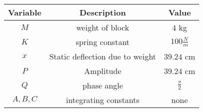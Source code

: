  \begin{tabular}{|c|c|c|} 
      \hline
\textbf{Variable}& \textbf{Description}& \textbf{Value}\\\hline
         $M$& weight of block &$4$ kg\\\hline
          $K$ & spring constant & $100\frac{N}{m}$  \\\hline
          $x$& Static deflection due to weight&$39.24$ cm\\\hline
          $P$& Amplitude & $39.24$ cm\\\hline
          $Q$& phase angle & $\frac{\pi}{2}$ \\ \hline
          $ A,B,C $& integrating constants & none \\ \hline
    \end{tabular}
